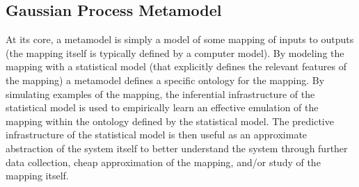 %  
%
%




%
\subsection{Gaussian Process Metamodel}
%

%
At its core, a metamodel is simply a model of some mapping of inputs to outputs 
(the mapping itself is typically defined by a computer model). By modeling the 
mapping with a statistical model (that explicitly defines the relevant features of the 
mapping) a metamodel defines a specific ontology for the mapping.  
By simulating examples of the mapping, the inferential infrastructure of the 
statistical model is used to empirically learn an effective emulation of the 
mapping within the ontology defined by the statistical model. %
The predictive infrastructure of the statistical model is then useful as an 
approximate abstraction of the system itself to better understand the system
through further data collection, cheap approximation of the mapping, and/or study 
of the mapping itself.

